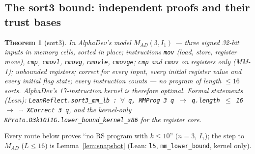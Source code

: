 \documentclass[11pt]{article}
\newtheorem{theorem}{Theorem}\newtheorem{lemma}[theorem]{Lemma}\newtheorem{corollary}[theorem]{Corollary}
\theoremstyle{remark}\newtheorem{remark}[theorem]{Remark}
\begin{document}
\subsection{The sort3 bound: independent proofs and their trust bases}\label{sec:sort3trust}
\begin{theorem}[sort3]\label{thm:sort3}
In AlphaDev's model $M_{AD}(3, I_1)$ --- three signed 32-bit inputs in memory cells, sorted in place; instructions
\texttt{mov} (load, store, register move), \texttt{cmp}, \texttt{cmovl}, \texttt{cmovg}, \texttt{cmovle}, \texttt{cmovge}; \texttt{cmp}
and \texttt{cmov} on registers only (MM-1); unbounded registers; correct for every input, every initial register value and
every initial flag state; every instruction counts --- no program of length $\le 16$ sorts. AlphaDev's 17-instruction kernel is
therefore optimal. Formal statements (Lean): \texttt{LeanReflect.sort3\_mm\_lb :
$\forall$ q, MMProg 3 q $\to$ q.length $\le$ 16 $\to$ $\lnot$ XCorrect 3 q}, and the kernel-only
\texttt{KProto.D3k10I1G.lower\_bound\_kernel\_x86} for the register core.
\end{theorem}
Every route below proves ``no RS program with $k \le 10$'' ($n=3$, $I_1$); the step to $M_{AD}$ ($L \le 16$) is
Lemma~\ref{lem:snapshot} (Lean: \texttt{l5}, \texttt{mm\_lower\_bound}, kernel only).
\end{document}
